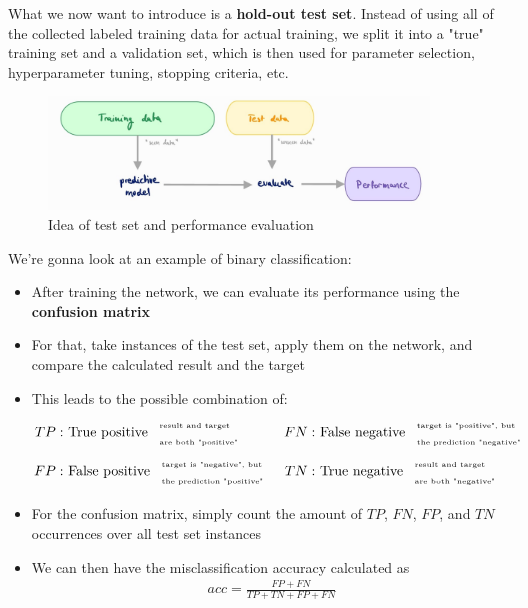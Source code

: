 What we now want to introduce is a \textbf{hold-out test set}. Instead of using all of the collected labeled training data for actual training, we split it into a "true" training set and a validation set, which is then used for parameter selection, hyperparameter tuning, stopping criteria, etc.

\begin{figure}[H]
  \centering
  \includegraphics[width=0.9\textwidth]{assets/sl/basic__performance.jpg}
  \caption{Idea of test set and performance evaluation}
  \label{fig:7_test_set_principle}
\end{figure}

We're gonna look at an example of binary classification:
\begin{itemize}
  \item After training the network, we can evaluate its performance using the \textbf{confusion matrix}
  \item For that, take instances of the test set, apply them on the network, and compare the calculated result and the target
  \item This leads to the possible combination of:
  \begin{align*}
    TP: & \text{ True positive } \begin{array}{l}\text{\tiny result and target}\\\text{\tiny are both "positive"}\end{array}
      & FN: & \text{ False negative }  \begin{array}{l}\text{\tiny target is "positive", but}\\\text{\tiny the prediction "negative"}\end{array}\\
    FP: & \text{ False positive } \begin{array}{l}\text{\tiny target is "negative", but}\\\text{\tiny the prediction "positive"}\end{array} 
      & TN: & \text{ True negative } \begin{array}{l}\text{\tiny result and target}\\\text{\tiny are both "negative"}\end{array}
  \end{align*}
  \item For the confusion matrix, simply count the amount of $TP$, $FN$, $FP$, and $TN$ occurrences over all test set instances
  \item We can then have the misclassification accuracy calculated as 
  \begin{align*}
    acc = \frac{FP+FN}{TP+TN+FP+FN}
  \end{align*}
\end{itemize}

